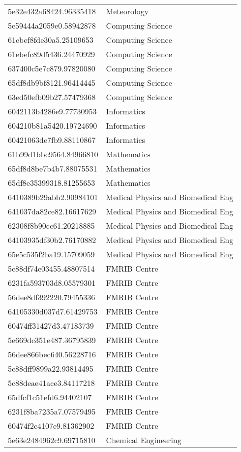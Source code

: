 \begin{tabular}{ll}
5e32e432a68424.96335418 & Meteorology \\
5e59444a2059e0.58942878 & Computing Science \\
61ebef8fde30a5.25109653 & Computing Science \\
61ebefc89d5436.24470929 & Computing Science \\
637400c5e7c879.97820080 & Computing Science \\
65df8db9bf8121.96414445 & Computing Science \\
63ed50efb09b27.57479368 & Computing Science \\
6042113b4286e9.77730953 & Informatics \\
604210b81a5420.19724690 & Informatics \\
60421063de7fb9.88110867 & Informatics \\
61b99d1bbc9564.84966810 & Mathematics \\
65df8d8be7b4b7.88075531 & Mathematics \\
65df8e35399318.81255653 & Mathematics \\
6410389b29abb2.90984101 & Medical Physics and Biomedical Eng \\
641037da82ce82.16617629 & Medical Physics and Biomedical Eng \\
62308f8b90cc61.20218885 & Medical Physics and Biomedical Eng \\
64103935df30b2.76170882 & Medical Physics and Biomedical Eng \\
65e5c535f2ba19.15709059 & Medical Physics and Biomedical Eng \\
5c88df74e03455.48807514 & FMRIB Centre \\
6231fa593703d8.05579301 & FMRIB Centre \\
56dee8df392220.79455336 & FMRIB Centre \\
64105330d037d7.61429753 & FMRIB Centre \\
60474ff31427d3.47183739 & FMRIB Centre \\
5e669dc351e487.36795839 & FMRIB Centre \\
56dee866bec640.56228716 & FMRIB Centre \\
5c88dff9899a22.93814495 & FMRIB Centre \\
5c88deae41ace3.84117218 & FMRIB Centre \\
65dfcf1c51efd6.94402107 & FMRIB Centre \\
6231f8ba7235a7.07579495 & FMRIB Centre \\
60474f2c4107e9.81362902 & FMRIB Centre \\
5e63e2484962c9.69715810 & Chemical Engineering \\

\end{tabular}
